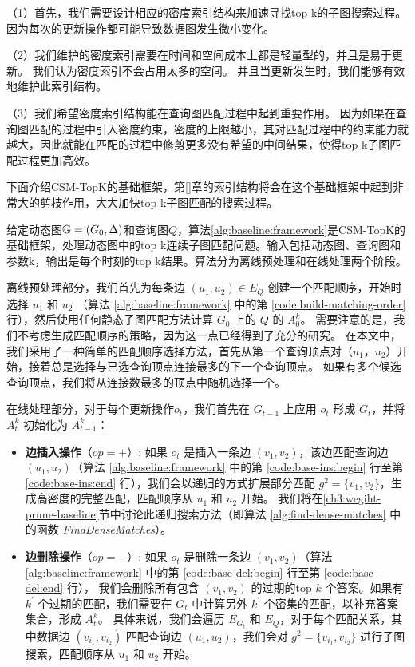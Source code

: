 （1）首先，我们需要设计相应的密度索引结构来加速寻找top k的子图搜索过程。
因为每次的更新操作都可能导致数据图发生微小变化。

（2）我们维护的密度索引需要在时间和空间成本上都是轻量型的，并且是易于更新。
我们认为密度索引不会占用太多的空间。
并且当更新发生时，我们能够有效地维护此索引结构。

（3）我们希望密度索引结构能在查询图匹配过程中起到重要作用。
因为如果在查询图匹配的过程中引入密度约束，密度的上限越小，其对匹配过程中的约束能力就越大，因此就能在匹配的过程中修剪更多没有希望的中间结果，使得top k子图匹配过程更加高效。

下面介绍CSM-TopK的基础框架，第\ref{}章的索引结构将会在这个基础框架中起到非常大的剪枝作用，大大加快top k子图匹配的搜索过程。


给定动态图$\mathbb{G}=(G_0, \Delta)$和查询图$Q$，算法\ref{alg:baseline:framework}是CSM-TopK的基础框架，处理动态图中的top k连续子图匹配问题。输入包括动态图、查询图和参数k，输出是每个时刻的top k结果。算法分为离线预处理和在线处理两个阶段。

离线预处理部分，我们首先为每条边 $(u_1, u_2) \in E_Q$ 创建一个匹配顺序，开始时选择 $u_1$ 和 $u_2$ （算法 \ref{alg:baseline:framework} 中的第 \ref{code:build-matching-order} 行），然后使用任何静态子图匹配方法计算 $G_0$ 上的 $Q$ 的 $A_0^k$。
需要注意的是，我们不考虑生成匹配顺序的策略，因为这一点已经得到了充分的研究。
在本文中，我们采用了一种简单的匹配顺序选择方法，首先从第一个查询顶点对（$u_1$，$u_2$）开始，接着总是选择与已选查询顶点连接最多的下一个查询顶点。
如果有多个候选查询顶点，我们将从连接数最多的顶点中随机选择一个。

在线处理部分，对于每个更新操作$o_t$，我们首先在 $G_{t-1}$ 上应用 $o_t$ 形成 $G_t$，并将 $A_t^k$ 初始化为 $A_{t-1}^k$：
\begin{itemize}
    \item \textbf{边插入操作}（$op=+$）: 如果 $o_t$ 是插入一条边 $(v_1, v_2)$，该边匹配查询边 $(u_1, u_2)$（算法 \ref{alg:baseline:framework} 中的第 \ref{code:base-ins:begin} 行至第 \ref{code:base-ins:end} 行），我们会以递归的方式扩展部分匹配 $g^2 = \{v_1, v_2\}$，生成高密度的完整匹配，匹配顺序从 $u_1$ 和 $u_2$ 开始。
    我们将在\ref{ch3:wegiht-prune-baseline}节中讨论此递归搜索方法（即算法 \ref{alg:find-dense-matches} 中的函数 \emph{FindDenseMatches}）。
    \item \textbf{边删除操作}（$op=-$）:  如果 $o_t$ 是删除一条边 $(v_1, v_2)$（算法 \ref{alg:baseline:framework} 中的第 \ref{code:base-del:begin} 行至第 \ref{code:base-del:end} 行），
    我们会删除所有包含 $(v_1, v_2)$ 的过期的top $k$ 个答案。如果有 $k^\prime$ 个过期的匹配，我们需要在 $G_t$ 中计算另外 $k^\prime$ 个密集的匹配，以补充答案集合，形成 $A_{t}^k$。
    具体来说，我们会遍历 $E_{G_t}$ 和 $E_Q$，对于每个匹配关系，其中数据边 $(v_{i_1}, v_{i_2})$ 匹配查询边 $(u_1, u_2)$，我们会对 $g^2 = \{v_{i_1}, v_{i_2}\}$ 进行子图搜索，匹配顺序从 $u_1$ 和 $u_2$ 开始。
\end{itemize}

